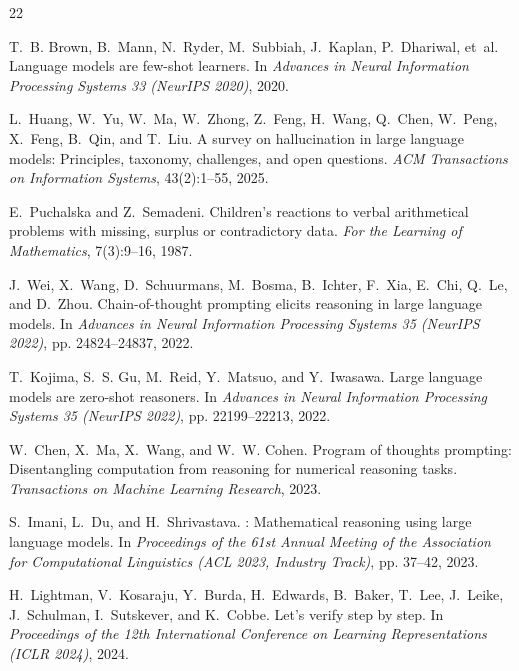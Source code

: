 \documentclass[sigconf, nonacm, onecolumn]{acmart}
\begin{document}

\begin{thebibliography}{22}

T.~B. Brown, B.~Mann, N.~Ryder, M.~Subbiah, J.~Kaplan, P.~Dhariwal, et~al.
\newblock Language models are few-shot learners.
\newblock In \emph{Advances in Neural Information Processing Systems 33
  (NeurIPS 2020)}, 2020.

L.~Huang, W.~Yu, W.~Ma, W.~Zhong, Z.~Feng, H.~Wang, Q.~Chen, W.~Peng,
  X.~Feng, B.~Qin, and T.~Liu.
\newblock A survey on hallucination in large language models: Principles,
  taxonomy, challenges, and open questions.
\newblock \emph{ACM Transactions on Information Systems}, 43(2):1--55, 2025.

E.~Puchalska and Z.~Semadeni.
\newblock Children's reactions to verbal arithmetical problems with missing,
  surplus or contradictory data.
\newblock \emph{For the Learning of Mathematics}, 7(3):9--16, 1987.

J.~Wei, X.~Wang, D.~Schuurmans, M.~Bosma, B.~Ichter, F.~Xia, E.~Chi,
  Q.~Le, and D.~Zhou.
\newblock Chain-of-thought prompting elicits reasoning in large language
  models.
\newblock In \emph{Advances in Neural Information Processing Systems 35
  (NeurIPS 2022)}, pp. 24824--24837, 2022.

T.~Kojima, S.~S. Gu, M.~Reid, Y.~Matsuo, and Y.~Iwasawa.
\newblock Large language models are zero-shot reasoners.
\newblock In \emph{Advances in Neural Information Processing Systems 35
  (NeurIPS 2022)}, pp. 22199--22213, 2022.

W.~Chen, X.~Ma, X.~Wang, and W.~W. Cohen.
\newblock Program of thoughts prompting: Disentangling computation from
  reasoning for numerical reasoning tasks.
\newblock \emph{Transactions on Machine Learning Research}, 2023.

S.~Imani, L.~Du, and H.~Shrivastava.
: Mathematical reasoning using large language models.
\newblock In \emph{Proceedings of the 61st Annual Meeting of the Association
  for Computational Linguistics (ACL 2023, Industry Track)}, pp. 37--42, 2023.

H.~Lightman, V.~Kosaraju, Y.~Burda, H.~Edwards, B.~Baker, T.~Lee, J.~Leike,
  J.~Schulman, I.~Sutskever, and K.~Cobbe.
\newblock Let's verify step by step.
\newblock In \emph{Proceedings of the 12th International Conference on
  Learning Representations (ICLR 2024)}, 2024.


\end{thebibliography}
\end{document}
